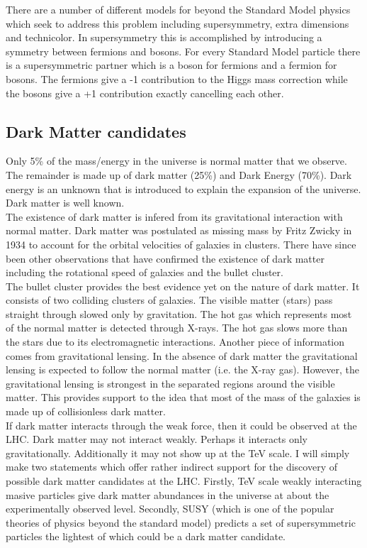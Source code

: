 There are a number of different models for beyond the Standard Model physics 
which seek to address this problem including supersymmetry, extra dimensions 
and technicolor. In supersymmetry this is accomplished by introducing a symmetry
between fermions and bosons. For every Standard Model particle there is a 
supersymmetric partner which is a boson for fermions and a fermion for bosons. 
The fermions give a -1 contribution to the Higgs mass correction while the 
bosons give a +1 contribution exactly cancelling each other.

\subsection{Dark Matter candidates}

Only 5\% of the mass/energy in the universe is normal matter that we observe. 
The remainder is made up of dark matter (25\%) and Dark Energy (70\%). Dark
energy is an unknown that is introduced to explain the expansion of the
universe. Dark matter is well known. \\

The existence of dark matter is infered from its gravitational interaction with
normal matter. Dark matter was postulated as missing mass by Fritz Zwicky in 
1934 to account for the orbital velocities of galaxies in clusters. There have 
since been other observations that have confirmed the existence of dark matter 
including the rotational speed of galaxies and the bullet cluster. \\

The bullet cluster provides the best evidence yet on the nature of dark matter. 
It consists of two colliding clusters of galaxies. The visible matter (stars) 
pass straight through slowed only by gravitation. The hot gas which represents 
most of the normal matter is detected through X-rays. The hot gas slows more 
than the stars due to its electromagnetic interactions. Another piece of
information comes from gravitational lensing. In the absence of dark matter the
gravitational lensing is expected to follow the normal matter (i.e. the X-ray 
gas). However, the gravitational lensing is strongest in the separated regions
around the visible matter. This provides support to the idea that most of the 
mass of the galaxies is made up of collisionless dark matter. \\

If dark matter interacts through the weak force, then it could be observed at
the LHC. Dark matter may not interact weakly. Perhaps it interacts only 
gravitationally. Additionally it may not show up at the TeV scale. I will simply
make two statements which offer rather indirect support for the discovery of 
possible dark matter candidates at the LHC. Firstly, TeV scale weakly 
interacting masive particles give dark matter abundances in the universe at 
about the experimentally observed level. Secondly, SUSY (which is one of the 
popular theories of physics beyond the standard model) predicts a set of 
supersymmetric particles the lightest of which could be a dark matter candidate.

